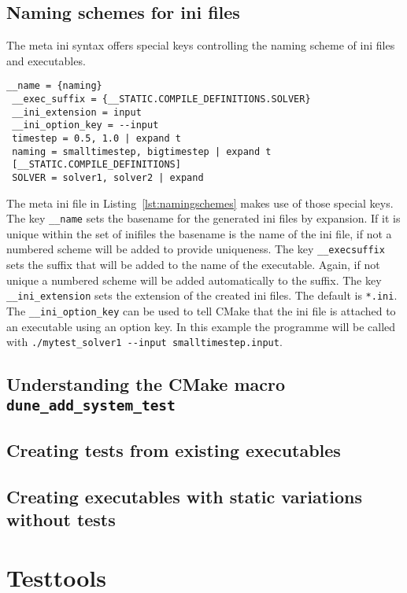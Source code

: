 \documentclass[11pt]{article}
\begin{document}
\subsection{Naming schemes for ini files}
\label{sec:namingschemes}
The meta ini syntax offers special keys controlling the naming scheme of ini files and executables.
\begin{lstlisting}[caption={Meta ini file using the special keys for setting the naming scheme},label=lst:namingschemes]
 __name = {naming}
 __exec_suffix = {__STATIC.COMPILE_DEFINITIONS.SOLVER}
 __ini_extension = input
 __ini_option_key = --input
 timestep = 0.5, 1.0 | expand t
 naming = smalltimestep, bigtimestep | expand t
 [__STATIC.COMPILE_DEFINITIONS]
 SOLVER = solver1, solver2 | expand
\end{lstlisting}
The meta ini file in Listing~\ref{lst:namingschemes} makes use of those special keys. The key \lstinline!__name! sets the basename for the
generated ini files by expansion. If it is unique within the set of inifiles the basename is the name of the ini file, if not a numbered scheme
will be added to provide uniqueness. The key \lstinline!__execsuffix! sets the suffix that will be added to the name of the executable. Again,
if not unique a numbered scheme will be added automatically to the suffix. The key \lstinline!__ini_extension! sets the extension of the created
ini files. The default is \lstinline!*.ini!. The \lstinline!__ini_option_key! can be used to tell CMake that the ini file is attached to an
executable using an option key. In this example the programme will be called with \lstinline!./mytest_solver1 --input smalltimestep.input!.

\subsection{Understanding the CMake macro \lstinline!dune_add_system_test!}

\subsection{Creating tests from existing executables}
\subsection{Creating executables with static variations without tests}

\section{Testtools}
\label{sec:testtools}
\end{document}
